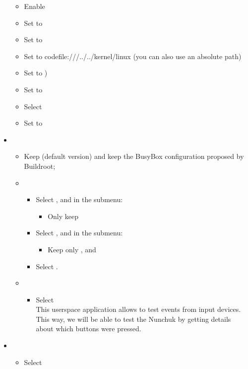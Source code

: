 \begin{itemize}
  \begin{itemize}
  \item Enable 
  \item Set  to 
  \item Set  to 
  \item Set  to code{file:///../../kernel/linux}
	(you can also use an absolute path)
  \item Set  to )
  \item Set  to 
  \item Select 
  \item Set  to 
\end{itemize}
\item {}
  \begin{itemize}
  \item Keep  (default version) and keep the BusyBox
    configuration proposed by Buildroot;
  \item {}
    \begin{itemize}
    \item Select , and in the submenu:
    \begin{itemize}
         \item Only keep 
    \end{itemize}
    \item Select , and in the submenu:
    \begin{itemize}
         \item Keep only ,  and 
    \end{itemize}
    \item Select .
    \end{itemize}
  \item {}
    \begin{itemize}
	 \item Select \\
	       This userspace application allows to test events from
	       input devices. This way, we will be able to test the
	       Nunchuk by getting details about which buttons were
	       pressed.
    \end{itemize}
  \end{itemize}
\item {}
  \begin{itemize}
  \item Select 
  \end{itemize}
\end{itemize}

